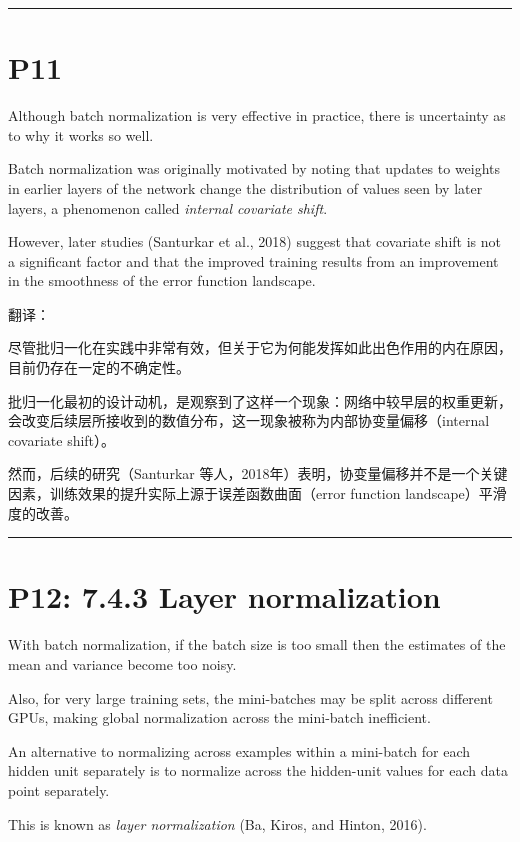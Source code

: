 \documentclass{article}
\begin{document}
\noindent\rule{\linewidth}{0.4pt}

\section{P11}

Although batch normalization is very effective in practice, there is uncertainty as to why it works so well. 

Batch normalization was originally motivated by noting that updates to weights in earlier layers of the network change the distribution of values seen by later layers, a phenomenon called \emph{internal covariate shift}. 

However, later studies (Santurkar et al., 2018) suggest that covariate shift is not a significant factor and that the improved training results from an improvement in the smoothness of the error function landscape.

{\color{red}
翻译：

尽管批归一化在实践中非常有效，但关于它为何能发挥如此出色作用的内在原因，目前仍存在一定的不确定性。

批归一化最初的设计动机，是观察到了这样一个现象：网络中较早层的权重更新，会改变后续层所接收到的数值分布，这一现象被称为内部协变量偏移（internal covariate shift）。

然而，后续的研究（Santurkar 等人，2018年）表明，协变量偏移并不是一个关键因素，训练效果的提升实际上源于误差函数曲面（error function landscape）平滑度的改善。

}

\noindent\rule{\linewidth}{0.4pt}

\section{P12: 7.4.3 Layer normalization}

With batch normalization, if the batch size is too small then the estimates of the mean and variance become too noisy. 

Also, for very large training sets, the mini-batches may be split across different GPUs, making global normalization across the mini-batch inefficient. 

An alternative to normalizing across examples within a mini-batch for each hidden unit separately is to normalize across the hidden-unit values for each data point separately. 

This is known as \emph{layer normalization} (Ba, Kiros, and Hinton, 2016). 
\end{document}

